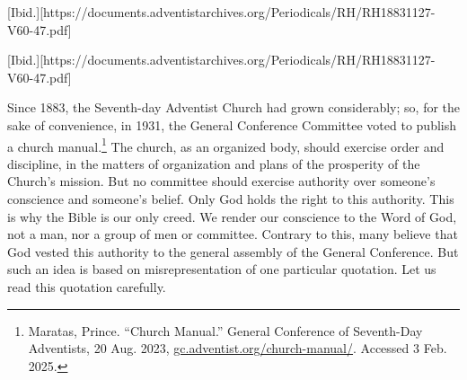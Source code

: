 [Ibid.][https://documents.adventistarchives.org/Periodicals/RH/RH18831127-V60-47.pdf]


[Ibid.][https://documents.adventistarchives.org/Periodicals/RH/RH18831127-V60-47.pdf]


Since 1883, the Seventh-day Adventist Church had grown considerably; so, for the sake of convenience, in 1931, the General Conference Committee voted to publish a church manual.\footnote{Maratas, Prince. “Church Manual.” General Conference of Seventh-Day Adventists, 20 Aug. 2023, \href{https://gc.adventist.org/church-manual/}{gc.adventist.org/church-manual/}. Accessed 3 Feb. 2025.} The church, as an organized body, should exercise order and discipline, in the matters of organization and plans of the prosperity of the Church's mission. But no committee should exercise authority over someone’s conscience and someone’s belief. Only God holds the right to this authority. This is why the Bible is our only creed. We render our conscience to the Word of God, not a man, nor a group of men or committee. Contrary to this, many believe that God vested this authority to the general assembly of the General Conference. But such an idea is based on misrepresentation of one particular quotation. Let us read this quotation carefully.


